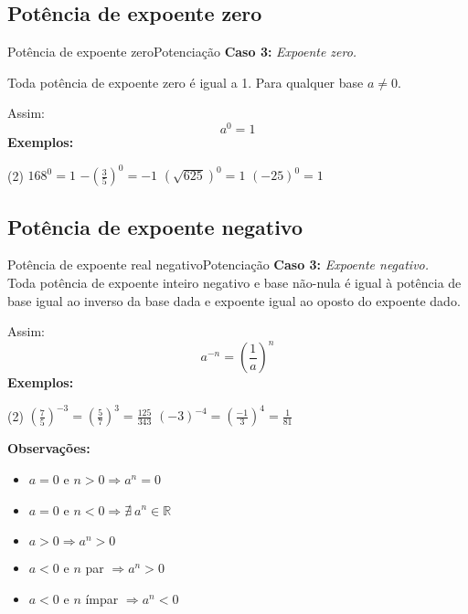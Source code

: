 \documentclass[aspectratio=169,11pt]{if-beamer}
\begin{document}
\subsection{Potência de expoente zero}
    \begin{frame}{Potência de expoente zero}{Potenciação}
        \textbf{Caso 3:} \textit{Expoente zero.}
        
        
            Toda potência de expoente zero é igual a 1. Para qualquer base \(a \neq 0\).
            
            Assim:
                \[ a^0 = 1 \]
            \textbf{Exemplos:}
                \begin{tasks}(2)
                    \task \( 168^0 = 1 \)
                    \task \( - \left( \frac{3}{5} \right)^0 = -1 \)
                    \task \( \left( \sqrt{625} \right)^0 = 1 \)
                    \task \( (-25)^0 = 1 \)
                \end{tasks}
    \end{frame}
\subsection{Potência de expoente negativo}
    \begin{frame}{Potência de expoente real negativo}{Potenciação}
        \textbf{Caso 3:} \textit{Expoente negativo.}
            \vspace{.1cm} 
            \\
            Toda potência de expoente inteiro negativo e base não-nula é igual à potência de base igual ao inverso da base dada e expoente igual ao oposto do expoente dado.
            
            Assim:
                \[ a^{-n} = \left( \frac{1}{a} \right)^n \]
            \textbf{Exemplos:}
                \begin{tasks}(2)
                    \task \( \left( \frac{7}{5} \right)^{-3} = \left( \frac{5}{7} \right)^{3} = \frac{125}{343}\)
                    \task \( \left( -3 \right)^{-4} = \left( \frac{-1}{3} \right)^4 = \frac{1}{81} \)
                \end{tasks}
                \vspace{.3cm}
\pause
            \textbf{Observações:}
                \begin{multicols}{2}
                \begin{itemize}
                    \item \(a = 0\) e \( n > 0 \Rightarrow a^n = 0\)
                    \item \(a = 0\) e \( n < 0 \Rightarrow \nexists~ a^n \in \mathbb{R}\)
                    \item \(a > 0 \Rightarrow a^n > 0\)
                    \item \( a < 0\) e \(n\) par \(\Rightarrow a^n > 0\)
                    \item \(a < 0\) e \(n\) ímpar \(\Rightarrow a^n < 0\)
                \end{itemize}
                \end{multicols}
    \end{frame}
    
\end{document}
